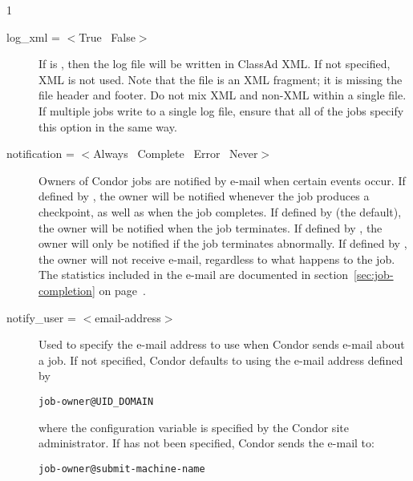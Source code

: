 \begin{ManPage}{\label{man-condor-submit}}{1}
\begin{description}

\item[log\_xml = $<$True \Bar\ False$>$]
If  is , 
then the log file will be written in ClassAd XML.
If not specified, XML is not used.
Note that the file is an XML fragment; it is
missing the file header and footer.
Do not mix XML and non-XML within a single file.
If multiple jobs write to a
single log file, ensure that all of the jobs specify
this option in the same way.


\item[notification = $<$Always \Bar\ Complete \Bar\ Error \Bar\ Never$>$]
\label{man-condor-submit-notification}
Owners of Condor jobs are notified by
e-mail when certain events occur.
If defined by , the owner will be notified
whenever the job produces a checkpoint, as well as when the job completes.
If defined by  (the default), the owner will
be notified when the job terminates.
If defined by , the owner will only be notified
if the job terminates abnormally.
If defined by , the owner will not receive e-mail,
regardless to what happens to the job.
The statistics included in the e-mail are documented in
section~\ref{sec:job-completion} on
page~\pageref{sec:job-completion}.


\item[notify\_user = $<$email-address$>$]
\label{man-condor-submit-notify-user}
Used to specify the e-mail
address to use when Condor sends e-mail about a job.  If not specified,
Condor defaults to using the e-mail address defined by
\begin{verbatim}
job-owner@UID_DOMAIN
\end{verbatim}
where the configuration variable 
is specified by the Condor site administrator.
If  has not been specified,
Condor sends the e-mail to:
\begin{verbatim}
job-owner@submit-machine-name
\end{verbatim}



\end{description}
\end{ManPage}
